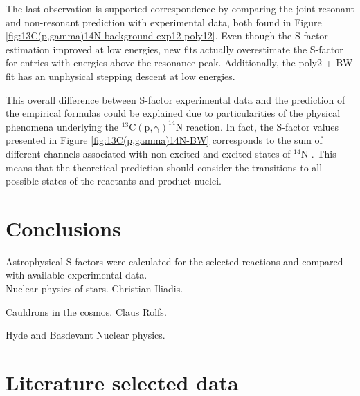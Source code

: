 \documentclass[openany]{book}
\begin{document}
The last observation is supported correspondence by comparing the joint resonant and non-resonant prediction with experimental data, both found in Figure \ref{fig:13C(p,gamma)14N-background-exp12-poly12}. Even though the S-factor estimation improved at low energies, new fits actually overestimate the  S-factor for entries with energies above the resonance peak. Additionally, the poly2 + BW fit has an unphysical stepping descent at low energies.


This overall difference between S-factor experimental data and the prediction of the empirical formulas could be explained due to particularities of the physical phenomena underlying the $\mathrm{{}^{13}C(p, \gamma)^{14}N}$ reaction. In fact, the S-factor values presented in Figure \ref{fig:13C(p,gamma)14N-BW} corresponds to the sum of different channels associated with non-excited and excited states of  $\mathrm{{}^{14}N}$ \cite{xu_takahashi_goriely_arnould_ohta_utsunomiya_2013}. This means that the theoretical prediction should consider the transitions to all possible states of the reactants and product nuclei.



\chapter{Conclusions} \label{ch:conclusions}

Astrophysical S-factors were calculated for the selected reactions and compared with available experimental data.  \\

Nuclear physics of stars. Christian Iliadis.

\vspace{1in}
Cauldrons in the cosmos.  Claus Rolfs.

\vspace{1in}
Hyde and Basdevant Nuclear physics.

\appendix

\chapter{Literature selected data} \label{ap:literatureData}
\end{document}
